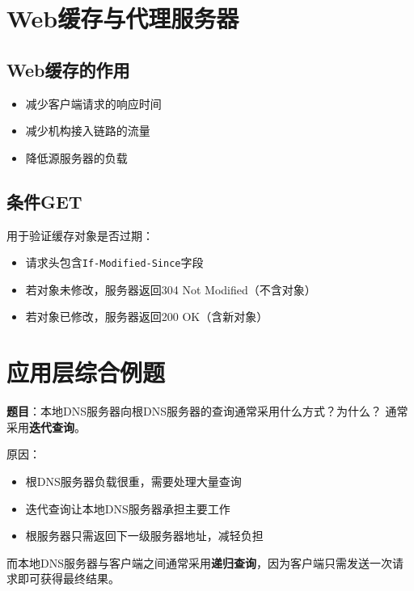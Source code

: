 \section{Web缓存与代理服务器}
\subsection{Web缓存的作用}
\begin{itemize}[leftmargin=2em,itemsep=0pt]
    \item 减少客户端请求的响应时间
    \item 减少机构接入链路的流量
    \item 降低源服务器的负载
\end{itemize}

\subsection{条件GET}
用于验证缓存对象是否过期：
\begin{itemize}[leftmargin=2em,itemsep=0pt]
    \item 请求头包含\texttt{If-Modified-Since}字段
    \item 若对象未修改，服务器返回304 Not Modified（不含对象）
    \item 若对象已修改，服务器返回200 OK（含新对象）
\end{itemize}

\section{应用层综合例题}

\begin{examplebox}[例题6.5 DNS查询类型]
\textbf{题目}：本地DNS服务器向根DNS服务器的查询通常采用什么方式？为什么？
\tcblower
通常采用\textbf{迭代查询}。

原因：
\begin{itemize}[itemsep=0pt]
    \item 根DNS服务器负载很重，需要处理大量查询
    \item 迭代查询让本地DNS服务器承担主要工作
    \item 根服务器只需返回下一级服务器地址，减轻负担
\end{itemize}

而本地DNS服务器与客户端之间通常采用\textbf{递归查询}，因为客户端只需发送一次请求即可获得最终结果。
\end{examplebox}

